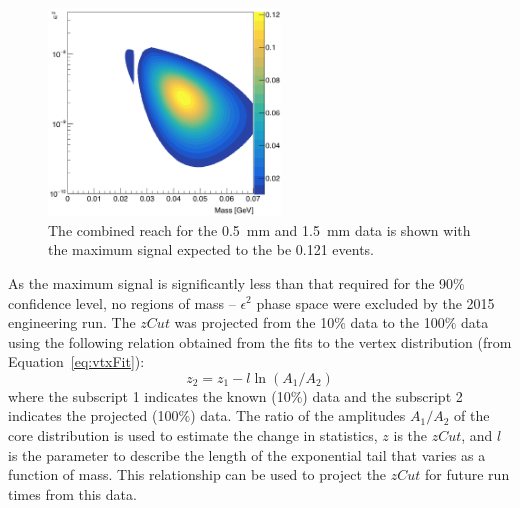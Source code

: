 \begin{figure}[htb]
  \centering
      \includegraphics[width=0.55\textwidth]{pics/results/combinedReach.png}
  \caption[Combined reach from all data for the 2015 engineering run]{The combined reach for the 0.5~mm and 1.5~mm data is shown with the maximum signal expected to the be 0.121 events.}
  \label{fig:comb_reach}
\end{figure} 
As the maximum signal is significantly less than that required for the 90$\%$ confidence level, no regions of mass -- $\epsilon^2$ phase space were excluded by the 2015 engineering run. The $zCut$ was projected from the 10$\%$ data to the 100$\%$ data using the following relation obtained from the fits to the vertex distribution (from Equation~\eqref{eq:vtxFit}):
\begin{equation}
\label{eq:zProjected}
z_{2} = z_{1} - l\ln(A_1/A_2)
\end{equation}
where the subscript 1 indicates the known (10$\%$) data and the subscript 2 indicates the projected (100$\%$) data. The ratio of the amplitudes $A_1/A_2$ of the core distribution is used to estimate the change in statistics, $z$ is the $zCut$, and $l$ is the parameter to describe the length of the exponential tail that varies as a function of mass. This relationship can be used to project the $zCut$ for future run times from this data. 

